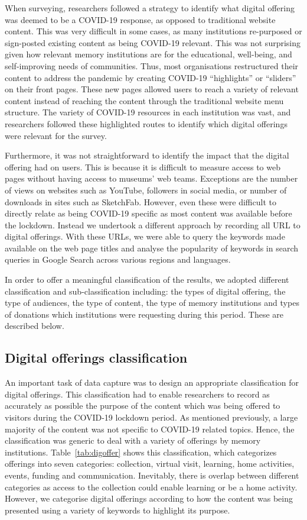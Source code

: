 \documentclass{egpubl}
\begin{document}
When surveying, researchers followed a strategy to identify what digital offering was deemed to be a COVID-19 response, as opposed to traditional website content. This was very difficult in some cases, as many institutions re-purposed or sign-posted existing content as being COVID-19 relevant. This was not surprising given how relevant memory institutions are for the educational, well-being, and self-improving needs of communities. Thus, most organisations restructured their content to address the pandemic by creating COVID-19 “highlights” or “sliders” on their front pages. These new pages allowed users to reach a variety of relevant content instead of reaching the content through the traditional website menu structure. The variety of COVID-19 resources in each institution was vast, and researchers followed these highlighted routes to identify which digital offerings were relevant for the survey.

Furthermore, it was not straightforward to identify the impact that the digital offering had on users. This is because it is difficult to measure access to web pages without having access to museums’ web teams. Exceptions are the number of views on websites such as YouTube, followers in social media, or number of downloads in sites such as SketchFab. However, even these were difficult to directly relate as being COVID-19 specific as most content was available before the lockdown. Instead we undertook a different approach by recording all URL to digital offerings. With these URLs, we were able to query the keywords made available on the web page titles and analyse the popularity of keywords in search queries in Google Search across various regions and languages. 

In order to offer a meaningful classification of the results, we adopted different classification and sub-classification including: the types of digital offering, the type of audiences, the type of content, the type of memory institutions and types of donations which institutions were requesting during this period. These are described below.

\subsection{Digital offerings classification}
An important task of data capture was to design an appropriate classification for digital offerings. This classification had to enable researchers to record as accurately as possible the purpose of the content which was being offered to visitors during the COVID-19 lockdown period. As mentioned previously, a large majority of the content was not specific to COVID-19 related topics. Hence, the classification was generic to deal with a variety of offerings by memory institutions. Table~\ref{tab:digoffer} shows this classification, which categorizes offerings into seven categories: collection, virtual visit, learning, home activities, events, funding and communication. Inevitably, there is overlap between different categories as access to the collection could enable learning or be a home activity. However, we categorise digital offerings according to how the content was being presented using a variety of keywords to highlight its purpose. 
\end{document}
